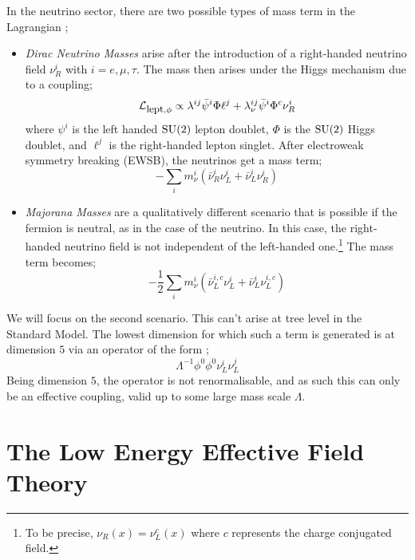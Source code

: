 In the neutrino sector, there are two possible types of mass term in the Lagrangian \cite{Ma1998, Bellini2018, Boehm2006, Yao2018};
\begin{itemize}
  \item \textit{Dirac Neutrino Masses} arise after the introduction of a right-handed neutrino field $\nu^i_R$ with $i = e, \mu, \tau$. The mass then arises under the Higgs mechanism due to a coupling;
  \begin{equation}
    \mathcal{L}_{\textrm{\small lept}, \phi} \propto \lambda^{ij}\bar{\psi}^i\Phi\ell^j + \lambda_\nu^{ij}\bar{\psi}^i\Phi^c \nu^i_R
  \end{equation}
  where $\psi^i$ is the left handed $\rm{SU}(2)$ lepton doublet, $\Phi$ is the $\rm{SU}(2)$ Higgs doublet, and $\ell^j$ is the right-handed lepton singlet. After electroweak symmetry breaking (EWSB), the neutrinos get a mass term;
  \begin{equation}
    -\sum_{i}{m_\nu^i \left(\bar{\nu}^i_R \nu^i_L + \bar{\nu}^i_L \nu^i_R\right)}
  \end{equation}
  \item \textit{Majorana Masses} are a qualitatively different scenario that is possible if the fermion is neutral, as in the case of the neutrino. In this case, the right-handed neutrino field is not independent of the left-handed one.\footnote{To be precise, $\nu_R(x) =
  \nu_L^c(x)$ where $c$ represents the charge conjugated field.} The mass term becomes;
  \begin{equation}\label{eq:Majorana Mass Term}
    -\frac{1}{2}\sum_{i}{m_\nu^i \left(\bar{\nu}_L^{i,c}\nu_L^i + \bar{\nu}^i_L \nu^{i, c}_L\right)}
  \end{equation}
\end{itemize}
We will focus on the second scenario. This can't arise at tree level in the Standard Model. The lowest dimension for which such a term is generated is at dimension $5$ via an operator of the form \cite{Bonnet2012};
\begin{equation}
  \Lambda^{-1}\phi^0 \phi^0 \nu^i_L \nu^j_L
\end{equation}
Being dimension $5$, the operator is not renormalisable, and as such this can only be an effective coupling, valid up to some large mass scale $\Lambda$.

\section{The Low Energy Effective Field Theory}

